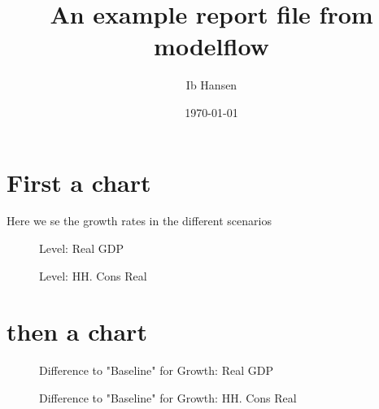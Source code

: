 \documentclass{article}
\begin{document}
\title{An example report file from modelflow }
\author{Ib Hansen}
\date{\today} 

\maketitle
\tableofcontents
\newpage
\section{First a chart} 
Here we se the growth rates in the different scenarios

 
\begin{figure}[htbp]
\centering
\resizebox{\textwidth}{!}{}
\caption{Level: Real GDP}
\end{figure}

 
\begin{figure}[htbp]
\centering
\resizebox{\textwidth}{!}{}
\caption{Level: HH. Cons Real}
\end{figure}

\section{then a chart}
 
\begin{figure}[htbp]
\centering
\resizebox{\textwidth}{!}{}
\caption{Difference to "Baseline" for Growth: Real GDP}
\end{figure}

 
\begin{figure}[htbp]
\centering
\resizebox{\textwidth}{!}{}
\caption{Difference to "Baseline" for Growth: HH. Cons Real}
\end{figure}
\end{document}
